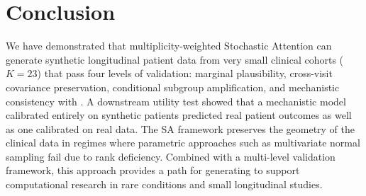 \section{Conclusion}
\label{sec:conclusion}

We have demonstrated that multiplicity-weighted Stochastic Attention can generate
synthetic longitudinal patient data from very small clinical cohorts ($K{=}23$) that
pass four levels of validation: marginal plausibility, cross-visit covariance
preservation, conditional subgroup amplification, and mechanistic consistency with . A downstream utility test showed
that a mechanistic model calibrated entirely on synthetic patients predicted real
patient outcomes as well as one calibrated on real data. The SA framework preserves
the geometry of the clinical data in regimes where parametric approaches such as
multivariate normal sampling fail due to rank deficiency.  Combined with a multi-level
validation framework, this approach provides a  path for generating
 to support computational research in rare
conditions and small longitudinal studies.
